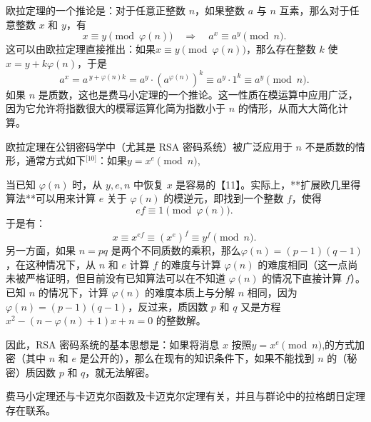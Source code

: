 欧拉定理的一个推论是：对于任意正整数 $n$，如果整数 $a$ 与 $n$ 互素，那么对于任意整数 $x$ 和 $y$，有
$$
x \equiv y \pmod{\varphi(n)} \quad \Rightarrow \quad a^x \equiv a^y \pmod{n}.~
$$
这可以由欧拉定理直接推出：如果$x \equiv y \pmod{\varphi(n)}$，那么存在整数 $k$ 使 $x = y + k\varphi(n)$，于是
$$
a^x = a^{\,y + \varphi(n)k} = a^y \cdot \left(a^{\varphi(n)}\right)^k \equiv a^y \cdot 1^k \equiv a^y \pmod{n}.~
$$
如果 $n$ 是质数，这也是费马小定理的一个推论。这一性质在模运算中应用广泛，因为它允许将指数很大的模幂运算化简为指数小于 $n$ 的情形，从而大大简化计算。

欧拉定理在公钥密码学中（尤其是 RSA 密码系统）被广泛应用于 $n$ 不是质数的情形，通常方式如下\(^\text{[10]}\)：如果$y = x^e \pmod{n}$,

当已知 $\varphi(n)$ 时，从 $y, e, n$ 中恢复 $x$ 是容易的【11】。实际上，**扩展欧几里得算法**可以用来计算 $e$ 关于 $\varphi(n)$ 的模逆元，即找到一个整数 $f$，使得
$$
ef \equiv 1 \pmod{\varphi(n)}.~
$$
于是有：
$$
x \equiv x^{ef} \equiv (x^e)^f \equiv y^f \pmod{n}.~
$$
另一方面，如果 $n = pq$ 是两个不同质数的乘积，那么$\varphi(n) = (p - 1)(q - 1)$，在这种情况下，从 $n$ 和 $e$ 计算 $f$ 的难度与计算 $\varphi(n)$ 的难度相同（这一点尚未被严格证明，但目前没有已知算法可以在不知道 $\varphi(n)$ 的情况下直接计算 $f$）。已知 $n$ 的情况下，计算 $\varphi(n)$ 的难度本质上与分解 $n$ 相同，因为$\varphi(n) = (p - 1)(q - 1)$，反过来，质因数 $p$ 和 $q$ 又是方程$x^2 - (n - \varphi(n) + 1)x + n = 0$
的整数解。

因此，RSA 密码系统的基本思想是：如果将消息 $x$ 按照$y = x^e \pmod{n}$,的方式加密（其中 $n$ 和 $e$ 是公开的），那么在现有的知识条件下，如果不能找到 $n$ 的（秘密）质因数 $p$ 和 $q$，就无法解密。

费马小定理还与卡迈克尔函数及卡迈克尔定理有关，并且与群论中的拉格朗日定理存在联系。

